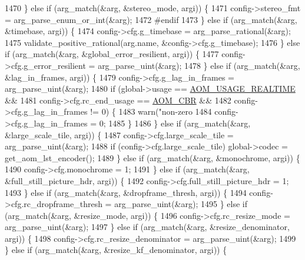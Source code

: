 \begin{DoxyCodeInclude}
{{{{{{{{{{{{{{{{1470     \} \textcolor{keywordflow}{else} \textcolor{keywordflow}{if} (arg\_match(&arg, &stereo\_mode, argi)) \{
1471       config->stereo\_fmt = arg\_parse\_enum\_or\_int(&arg);
1472 \textcolor{preprocessor}{#endif}
1473     \} \textcolor{keywordflow}{else} \textcolor{keywordflow}{if} (arg\_match(&arg, &timebase, argi)) \{
1474       config->cfg.g\_timebase = arg\_parse\_rational(&arg);
1475       validate\_positive\_rational(arg.name, &config->cfg.g\_timebase);
1476     \} \textcolor{keywordflow}{else} \textcolor{keywordflow}{if} (arg\_match(&arg, &global\_error\_resilient, argi)) \{
1477       config->cfg.g\_error\_resilient = arg\_parse\_uint(&arg);
1478     \} \textcolor{keywordflow}{else} \textcolor{keywordflow}{if} (arg\_match(&arg, &lag\_in\_frames, argi)) \{
1479       config->cfg.g\_lag\_in\_frames = arg\_parse\_uint(&arg);
1480       \textcolor{keywordflow}{if} (global->usage == \hyperlink{group__encoder_gae2cc24d3083099df8eb60ad65f81c62f}{AOM\_USAGE\_REALTIME} &&
1481           config->cfg.rc\_end\_usage == \hyperlink{group__encoder_gga7c084d3ecef569aad166ce70b0e8a957a14b6057d61c61e6117f5af16dcf89b0c}{AOM\_CBR} &&
1482           config->cfg.g\_lag\_in\_frames != 0) \{
1483         warn(\textcolor{stringliteral}{"non-zero %
1484         config->cfg.g\_lag\_in\_frames = 0;
1485       \}
1486     \} \textcolor{keywordflow}{else} \textcolor{keywordflow}{if} (arg\_match(&arg, &large\_scale\_tile, argi)) \{
1487       config->cfg.large\_scale\_tile = arg\_parse\_uint(&arg);
1488       \textcolor{keywordflow}{if} (config->cfg.large\_scale\_tile) global->codec = get\_aom\_lst\_encoder();
1489     \} \textcolor{keywordflow}{else} \textcolor{keywordflow}{if} (arg\_match(&arg, &monochrome, argi)) \{
1490       config->cfg.monochrome = 1;
1491     \} \textcolor{keywordflow}{else} \textcolor{keywordflow}{if} (arg\_match(&arg, &full\_still\_picture\_hdr, argi)) \{
1492       config->cfg.full\_still\_picture\_hdr = 1;
1493     \} \textcolor{keywordflow}{else} \textcolor{keywordflow}{if} (arg\_match(&arg, &dropframe\_thresh, argi)) \{
1494       config->cfg.rc\_dropframe\_thresh = arg\_parse\_uint(&arg);
1495     \} \textcolor{keywordflow}{else} \textcolor{keywordflow}{if} (arg\_match(&arg, &resize\_mode, argi)) \{
1496       config->cfg.rc\_resize\_mode = arg\_parse\_uint(&arg);
1497     \} \textcolor{keywordflow}{else} \textcolor{keywordflow}{if} (arg\_match(&arg, &resize\_denominator, argi)) \{
1498       config->cfg.rc\_resize\_denominator = arg\_parse\_uint(&arg);
1499     \} \textcolor{keywordflow}{else} \textcolor{keywordflow}{if} (arg\_match(&arg, &resize\_kf\_denominator, argi)) \{
}}}}}}}}}}}}}}}}}
\end{DoxyCodeInclude}
